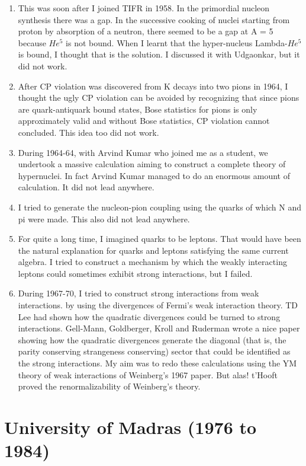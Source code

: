 \begin{enumerate}
\item This was soon after I joined TIFR in 1958. In the primordial nucleon 
synthesis there was a gap. In the successive cooking of nuclei starting 
from proton by absorption of a neutron, there seemed to be a gap at A = 
5 because $He^5$ is not bound. When I learnt that the hyper-nucleus 
Lambda-$He^5$ is bound, I thought that is the solution. I discussed it 
with Udgaonkar, but it did not work.
\item After CP violation was discovered from K decays into two pions in 
1964, I thought the ugly CP violation can be avoided by recognizing that 
since pions are quark-antiquark bound states, Bose statistics for pions 
is only approximately valid and without Bose statistics, CP violation 
cannot concluded. This idea too did not work.
\item During 1964-64, with Arvind Kumar who joined me as a student, we 
undertook a massive calculation aiming to construct a complete theory of 
hypernuclei. In fact Arvind Kumar managed to do an enormous amount of 
calculation. It did not lead anywhere.
\item I tried to generate the nucleon-pion coupling using the quarks of 
which N and pi were made. This also did not lead anywhere.
\item For quite a long time, I imagined quarks to be leptons. That would have 
been the natural explanation for quarks and leptons satisfying the same 
current algebra. I tried to construct a mechanism by which the weakly 
interacting leptons could sometimes exhibit strong interactions, but I 
failed.
\item During 1967-70, I tried to construct strong interactions from weak 
interactions. by using the divergences of Fermi's weak interaction 
theory. TD Lee had shown how the quadratic divergences could be turned 
to strong interactions. Gell-Mann, Goldberger, Kroll and Ruderman wrote 
a nice paper showing how the quadratic divergences generate the diagonal 
(that is, the parity conserving strangeness conserving) sector that 
could be identified as the strong interactions. My aim was to redo these 
calculations using the YM theory of weak interactions of Weinberg's 1967 
paper. But alas! t'Hooft proved the renormalizability of Weinberg's 
theory.
\end{enumerate}

\section*{University of Madras (1976 to 1984)}

